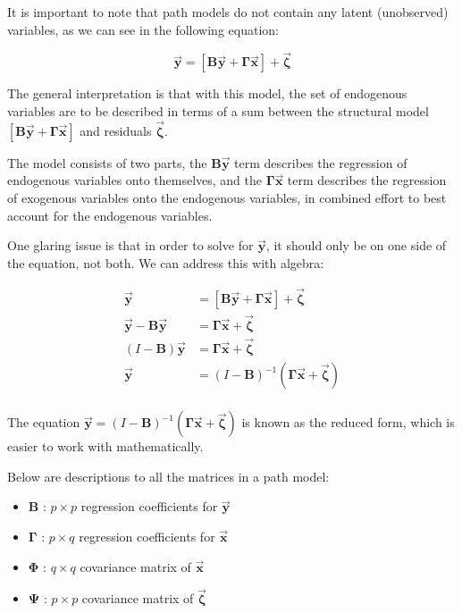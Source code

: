 \documentclass{article}
\begin{document}
\begin{multicols*}{2}
It is important to note that path models do not contain any latent (unobserved) variables, as we can see in the following equation: 

\[\mathbf{\vec{y}} = [\mathbf{B} \mathbf{\vec{y}} + \mathbf{\Gamma} \mathbf{\vec{x}}] + \mathbf{\vec{\zeta}}\]

The general interpretation is that with this model, the set of endogenous variables are to be described in terms of a sum between the structural model $[\mathbf{B} \mathbf{\vec{y}} + \mathbf{\Gamma} \mathbf{\vec{x}}]$ and residuals $\mathbf{\vec{\zeta}}$.

The model consists of two parts, the $\mathbf{B} \mathbf{\vec{y}}$ term describes the regression of endogenous variables onto themselves, and the $\mathbf{\Gamma} \mathbf{\vec{x}}$ term describes the regression of exogenous variables onto the endogenous variables, in combined effort to best account for the endogenous variables.

One glaring issue is that in order to solve for $\mathbf{\vec{y}}$, it should only be on one side of the equation, not both. We can address this with algebra:

\[
\begin{aligned}
    \mathbf{\vec{y}} &= [\mathbf{B} \mathbf{\vec{y}} + \mathbf{\Gamma} \mathbf{\vec{x}}] + \mathbf{\vec{\zeta}} \\
    \mathbf{\vec{y}} - \mathbf{B} \mathbf{\vec{y}} &= \mathbf{\Gamma} \mathbf{\vec{x}} + \mathbf{\vec{\zeta}} \\
    (I - \mathbf{B}) \mathbf{\vec{y}} &= \mathbf{\Gamma} \mathbf{\vec{x}} + \mathbf{\vec{\zeta}} \\
    \mathbf{\vec{y}} &= (I - \mathbf{B})^{-1}(\mathbf{\Gamma} \mathbf{\vec{x}} + \mathbf{\vec{\zeta}}) \\
\end{aligned}    
\]

The equation $\mathbf{\vec{y}} = (I - \mathbf{B})^{-1}(\mathbf{\Gamma} \mathbf{\vec{x}} + \mathbf{\vec{\zeta}})$ is known as the reduced form, which is easier to work with mathematically.

Below are descriptions to all the matrices in a path model:
\begin{itemize}
    \item $\mathbf{B}$ : $p \times p$ regression coefficients for $\mathbf{\vec{y}}$
    \item $\mathbf{\Gamma}$ : $p \times q$ regression coefficients for $\mathbf{\vec{x}}$
    \item $\mathbf{\Phi}$ : $q \times q$ covariance matrix of $\mathbf{\vec{x}}$
    \item $\mathbf{\Psi}$ : $p \times p$ covariance matrix of $\mathbf{\vec{\zeta}}$
\end{itemize}


\end{multicols*}
\end{document}
